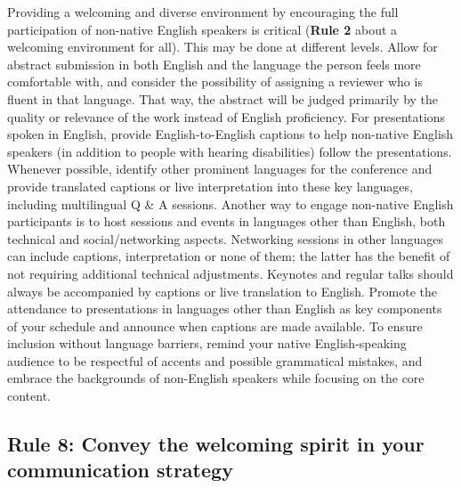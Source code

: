 \documentclass[10pt,letterpaper]{article}
\begin{document}
Providing a welcoming and diverse environment by encouraging the full participation of non-native English speakers is critical (\textbf{Rule 2} about a welcoming environment for all). This may be done at different levels.
 Allow for abstract submission in both English and the language the person feels more comfortable with, and consider the possibility of assigning a reviewer who is fluent in that language. That way, the abstract will be judged primarily by the quality or relevance of the work instead of English proficiency.
For presentations spoken in English, provide English-to-English captions to help non-native English speakers (in addition to people with hearing disabilities) follow the presentations. Whenever possible, identify other prominent languages for the conference and provide translated captions or live interpretation into these key languages, including multilingual Q \& A sessions.
Another way to engage non-native English participants is to host sessions and events in languages other than English, both technical and social/networking aspects. Networking sessions in other languages can include captions, interpretation or none of them; the latter has the benefit of not requiring additional technical adjustments. 
Keynotes and regular talks should always be accompanied by captions or live translation to English.
Promote the attendance to presentations in languages other than English as key components of your schedule and announce when captions are made available. 
To ensure inclusion without language barriers, remind your native English-speaking audience to be respectful of accents and possible grammatical mistakes, and embrace the backgrounds of non-English speakers while focusing on the core content. 




\subsection*{Rule 8: Convey the welcoming spirit in your communication strategy}
\label{rule_communication}
\end{document}
